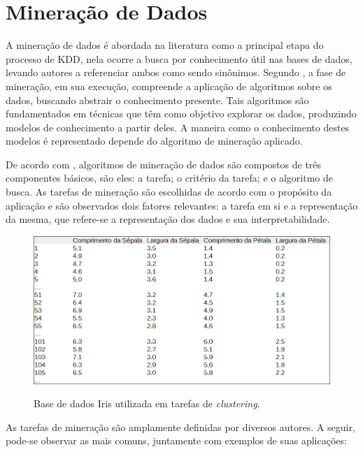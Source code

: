 \section{Mineração de Dados}
\label{sec:data-mining}

A mineração de dados é abordada na literatura como a principal etapa do processo de KDD, nela ocorre a busca por conhecimento útil nas bases de dados, levando autores a referenciar ambos como sendo sinônimos. Segundo , a fase de mineração, em sua execução, compreende a aplicação de algoritmos sobre os dados, buscando abstrair o conhecimento presente. Tais algoritmos são fundamentados em técnicas que têm como objetivo explorar os dados, produzindo modelos de conhecimento a partir deles. A maneira como o conhecimento destes modelos é representado depende do algoritmo de mineração aplicado.

De acordo com , algoritmos de mineração de dados são compostos de três componentes básicos, são eles: a tarefa; o critério da tarefa; e o algoritmo de busca. As tarefas de mineração são escolhidas de acordo com o propósito da aplicação e são observados dois fatores relevantes: a tarefa em si e a representação da mesma, que refere\hyp{}se a representação dos dados e sua interpretabilidade.

\begin{figure}[H]
    \centering
    \caption{Base de dados Iris utilizada em tarefas de \textit{clustering}.}
    \includegraphics[width=0.9\linewidth]{figuras/iris-clustering.png}
    \label{fig:iris-clustering}
\end{figure}

As tarefas de mineração são amplamente definidas por diversos autores. A seguir, pode\hyp{}se observar as mais comuns, juntamente com exemplos de suas aplicações:

